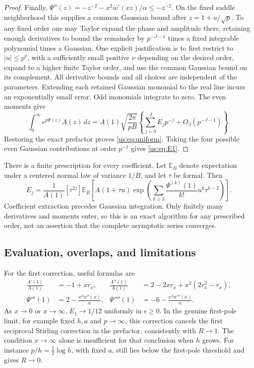 \documentclass[11pt,a4paper]{article}
\numberwithin{equation}{section}
\theoremstyle{plain}
\theoremstyle{definition}
\theoremstyle{remark}
\begin{document}
\begin{proof}
Finally,
$\Psi''(z)=-z^{-2}-x^2w'(xz)/\alpha\le-z^{-2}$.
On the fixed saddle neighborhood this supplies a common Gaussian
bound after $z=1+u/\sqrt p$. To any fixed order one may Taylor
expand the phase and amplitude there, retaining enough derivatives
to bound the remainder by $p^{-J-1}$ times a fixed integrable
polynomial times a Gaussian. One explicit justification is to first
restrict to $|u|\le p^\nu$, with a sufficiently small positive
$\nu$ depending on the desired order, expand to a higher finite
Taylor order, and use the common Gaussian bound on its complement.
All derivative bounds and all choices are independent of the
parameters. Extending each retained Gaussian monomial to the real
line incurs an exponentially small error. Odd monomials integrate
to zero. The even moments give
\[
 \int_0^\infty e^{p\Psi(z)}A(z)\,dz
 =A(1)\sqrt{\frac{2\pi}{pB}}
   \left\{\sum_{j=0}^J E_jp^{-j}+O_J(p^{-J-1})\right\}.
\]
Restoring the exact prefactor proves \eqref{us:eq:uniform}.
Taking the four possible even Gaussian contributions at order
$p^{-1}$ gives \eqref{us:eq:E1}.
\end{proof}

There is a finite prescription for every coefficient. Let
$\mathbb E_B$ denote expectation under a centered normal law of
variance $1/B$, and let $\tau$ be formal. Then
\begin{equation}\label{us:eq:coefficient-recipe}
 E_j=\frac1{A(1)}[\tau^{2j}]
 \mathbb E_B\!\left[
 A(1+\tau u)
 \exp\!\left(\sum_{k\ge3}
      \frac{\Psi^{(k)}(1)}{k!}u^k\tau^{k-2}\right)\right].
\end{equation}
Coefficient extraction precedes Gaussian integration. Only finitely
many derivatives and moments enter, so this is an exact algorithm
for any prescribed order, not an assertion that the complete
asymptotic series converges.

\subsection{Evaluation, overlaps, and limitations}

For the first correction, useful formulas are
\begin{align}
 \frac{A'(1)}{A(1)}&=-1+xr_x,&
 \frac{A''(1)}{A(1)}&=2-2xr_x+x^2(2r_x^2-r_x),\label{us:eq:amplitude-derivatives}\\
 \Psi'''(1)&=2-\frac{x^3w''(x)}\alpha,&
 \Psi''''(1)&=-6-\frac{x^4w'''(x)}\alpha.
 \label{us:eq:phase-derivatives}
\end{align}
As $x\to0$ or $x\to\infty$, $E_1\to1/12$ uniformly in
$\epsilon\ge0$. In the genuine first-pole limit, for example fixed
$h,a$ and $p\to\infty$, this correction cancels the first reciprocal
Stirling correction in the prefactor, consistently with $R\to1$.
The condition $x\to\infty$ alone is insufficient for that conclusion
when $h$ grows. For instance $p/h=\tfrac12\log h$, with fixed $a$,
still lies below the first-pole threshold and gives $R\to0$.
\end{document}
